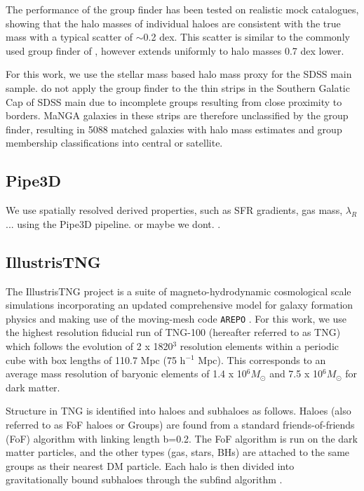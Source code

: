 \documentclass[fleqn,usenatbib]{mnras}
\begin{document}
The performance of the group finder has been tested on realistic mock catalogues, showing that the halo masses of individual haloes are consistent with the true mass with a typical scatter of $\sim$0.2 dex. This scatter is similar to the commonly used group finder of \citet{yang2007}, however extends uniformly to halo masses 0.7 dex lower. 

For this work, we use the stellar mass based halo mass proxy for the SDSS main sample. \citet{lim2017} do not apply the group finder to the thin strips in the Southern Galatic Cap of SDSS main due to incomplete groups resulting from close proximity to borders. MaNGA galaxies in these strips are therefore unclassified by the group finder, resulting in 5088 matched galaxies with halo mass estimates and group membership classifications into central or satellite.

\subsection{Pipe3D}
We use spatially resolved derived properties, such as SFR gradients, gas mass, $\lambda_{R}$... using the Pipe3D pipeline. or maybe we dont. \citep{pipe3Da,pipe3Dvac}.

\subsection{IllustrisTNG}
The IllustrisTNG project \citep{marinacci18,naiman18,nelson18,pillepich18b,springel18} is a suite of magneto-hydrodynamic cosmological scale simulations incorporating an updated comprehensive model for galaxy formation physics \citep[as decribed in; ][]{weinberger17,pillepich18a} and making use of the moving-mesh code \texttt{AREPO} \citep{springel10,pakmor11,pakmor13}. For this work, we use the highest resolution fiducial run of TNG-100 (hereafter referred to as TNG) which follows the evolution of 2 x 1820$^3$ resolution elements within a periodic cube with box lengths of 110.7 Mpc (75 h$^{-1}$ Mpc). This corresponds to an average mass resolution of baryonic elements of 1.4 x 10$^6 M_{\odot}$ and 7.5 x 10$^6 M_{\odot}$ for dark matter. 

Structure in TNG is identified into haloes and subhaloes as follows. Haloes (also referred to as FoF haloes or Groups) are found from a standard friends-of-friends (FoF) algorithm \citep{davis85} with linking length b=0.2. The FoF algorithm is run on the dark matter particles, and the other types (gas, stars, BHs) are attached to the same groups as their nearest DM particle. Each halo is then divided into gravitationally bound subhaloes through the subfind algorithm \citep{springel01}.
\end{document}
